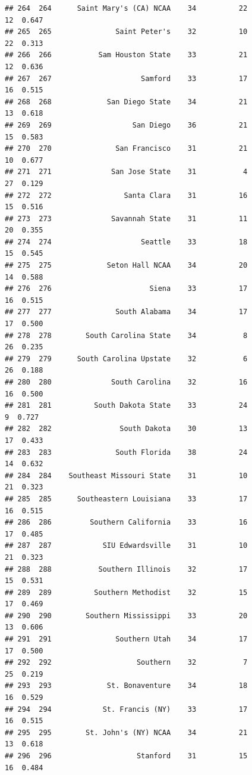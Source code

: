 \documentclass[]{book}
\begin{document}
\begin{verbatim}
## 264  264      Saint Mary's (CA) NCAA    34          22            12  0.647
## 265  265               Saint Peter's    32          10            22  0.313
## 266  266           Sam Houston State    33          21            12  0.636
## 267  267                     Samford    33          17            16  0.515
## 268  268             San Diego State    34          21            13  0.618
## 269  269                   San Diego    36          21            15  0.583
## 270  270               San Francisco    31          21            10  0.677
## 271  271              San Jose State    31           4            27  0.129
## 272  272                 Santa Clara    31          16            15  0.516
## 273  273              Savannah State    31          11            20  0.355
## 274  274                     Seattle    33          18            15  0.545
## 275  275             Seton Hall NCAA    34          20            14  0.588
## 276  276                       Siena    33          17            16  0.515
## 277  277               South Alabama    34          17            17  0.500
## 278  278        South Carolina State    34           8            26  0.235
## 279  279      South Carolina Upstate    32           6            26  0.188
## 280  280              South Carolina    32          16            16  0.500
## 281  281          South Dakota State    33          24             9  0.727
## 282  282                South Dakota    30          13            17  0.433
## 283  283               South Florida    38          24            14  0.632
## 284  284    Southeast Missouri State    31          10            21  0.323
## 285  285      Southeastern Louisiana    33          17            16  0.515
## 286  286         Southern California    33          16            17  0.485
## 287  287            SIU Edwardsville    31          10            21  0.323
## 288  288           Southern Illinois    32          17            15  0.531
## 289  289          Southern Methodist    32          15            17  0.469
## 290  290        Southern Mississippi    33          20            13  0.606
## 291  291               Southern Utah    34          17            17  0.500
## 292  292                    Southern    32           7            25  0.219
## 293  293             St. Bonaventure    34          18            16  0.529
## 294  294            St. Francis (NY)    33          17            16  0.515
## 295  295        St. John's (NY) NCAA    34          21            13  0.618
## 296  296                    Stanford    31          15            16  0.484

\end{verbatim}
\end{document}
